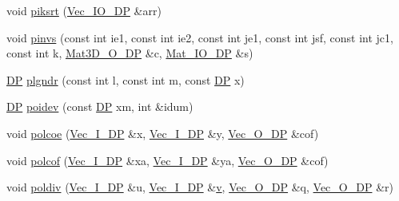 \begin{DoxyCompactItemize}
\item 
void \mbox{\hyperlink{namespaceNR_a11f36d67ab2adaed64b8f5dbfbbf2efc}{piksrt}} (\mbox{\hyperlink{namespaceNR_ab293e06a6bf799d8a7ed932b6852bcb8}{Vec\+\_\+\+I\+O\+\_\+\+DP}} \&arr)
\item 
void \mbox{\hyperlink{namespaceNR_a34209b0a9d44aa222a5f76c3c7bdeeaa}{pinvs}} (const int ie1, const int ie2, const int je1, const int jsf, const int jc1, const int k, \mbox{\hyperlink{namespaceNR_a74d09ea99e0452b529d2eb055cb09108}{Mat3\+D\+\_\+\+O\+\_\+\+DP}} \&c, \mbox{\hyperlink{namespaceNR_ad1513aa4697878ed3bff0b8b3c9dd910}{Mat\+\_\+\+I\+O\+\_\+\+DP}} \&s)
\item 
\mbox{\hyperlink{namespaceNR_af6ff762dd605ff477b8e52387253a02a}{DP}} \mbox{\hyperlink{namespaceNR_a677f4e9cdd801b4a29b667ac6915ac26}{plgndr}} (const int l, const int m, const \mbox{\hyperlink{namespaceNR_af6ff762dd605ff477b8e52387253a02a}{DP}} x)
\item 
\mbox{\hyperlink{namespaceNR_af6ff762dd605ff477b8e52387253a02a}{DP}} \mbox{\hyperlink{namespaceNR_a0612378e73208e941cd53484771f52bb}{poidev}} (const \mbox{\hyperlink{namespaceNR_af6ff762dd605ff477b8e52387253a02a}{DP}} xm, int \&idum)
\item 
void \mbox{\hyperlink{namespaceNR_a404e4e04344a84403f08fcd906a91b2d}{polcoe}} (\mbox{\hyperlink{namespaceNR_a9f943da53862537c552e2a770cb170ae}{Vec\+\_\+\+I\+\_\+\+DP}} \&x, \mbox{\hyperlink{namespaceNR_a9f943da53862537c552e2a770cb170ae}{Vec\+\_\+\+I\+\_\+\+DP}} \&y, \mbox{\hyperlink{namespaceNR_a970094d23441f8ef6a45282a7eb2103d}{Vec\+\_\+\+O\+\_\+\+DP}} \&cof)
\item 
void \mbox{\hyperlink{namespaceNR_af2c475d479fbaa639b53b606796608c6}{polcof}} (\mbox{\hyperlink{namespaceNR_a9f943da53862537c552e2a770cb170ae}{Vec\+\_\+\+I\+\_\+\+DP}} \&xa, \mbox{\hyperlink{namespaceNR_a9f943da53862537c552e2a770cb170ae}{Vec\+\_\+\+I\+\_\+\+DP}} \&ya, \mbox{\hyperlink{namespaceNR_a970094d23441f8ef6a45282a7eb2103d}{Vec\+\_\+\+O\+\_\+\+DP}} \&cof)
\item 
void \mbox{\hyperlink{namespaceNR_a2ec54779e5505f4a702196d44766e022}{poldiv}} (\mbox{\hyperlink{namespaceNR_a9f943da53862537c552e2a770cb170ae}{Vec\+\_\+\+I\+\_\+\+DP}} \&u, \mbox{\hyperlink{namespaceNR_a9f943da53862537c552e2a770cb170ae}{Vec\+\_\+\+I\+\_\+\+DP}} \&\mbox{\hyperlink{adat__devel_2lib_2hadron_2hadron__timeslice_8cc_a716fc87f5e814be3ceee2405ed6ff22a}{v}}, \mbox{\hyperlink{namespaceNR_a970094d23441f8ef6a45282a7eb2103d}{Vec\+\_\+\+O\+\_\+\+DP}} \&q, \mbox{\hyperlink{namespaceNR_a970094d23441f8ef6a45282a7eb2103d}{Vec\+\_\+\+O\+\_\+\+DP}} \&r)

\end{DoxyCompactItemize}

